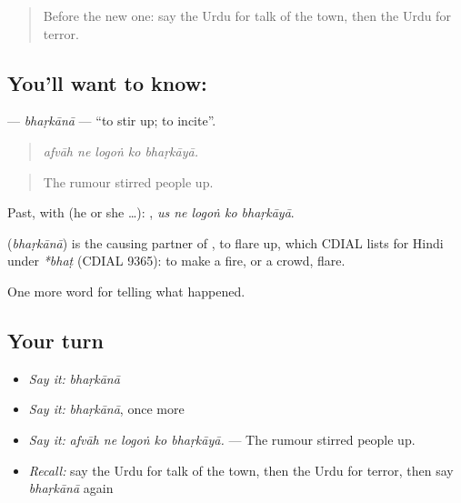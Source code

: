 \label{lesson:UR-C302-bharkana}



\begin{quote}
Before the new one: say the Urdu for talk of the town, then the Urdu for terror.
\end{quote}

\subsection*{You'll want to know: }
\textbf{} — \emph{bhaṛkānā} — \textquotedblleft{}to stir up; to incite\textquotedblright{}.

\begin{quote}
    
\end{quote}

\begin{quote}
\emph{afvāh ne logoṅ ko bhaṛkāyā.}
\end{quote}

\begin{quote}
The rumour stirred people up.
\end{quote}

Past, with  (he or she …):     , \emph{us ne logoṅ ko bhaṛkāyā}.

\begin{cousinweb}
\textbf{} (\emph{bhaṛkānā}) is the causing partner of \textbf{}, to flare up, which CDIAL lists for Hindi under \emph{*bhaṭ} (CDIAL 9365): to make a fire, or a crowd, flare.
\end{cousinweb}

\begin{grammarlens}[title={What you've built}]
One more word for telling what happened.
\end{grammarlens}

\subsection*{Your turn}
\begin{itemize}
\raggedright
  \item \emph{Say it:} \emph{bhaṛkānā}
  \item \emph{Say it:} \emph{bhaṛkānā}, once more
  \item \emph{Say it:} \emph{afvāh ne logoṅ ko bhaṛkāyā.} — The rumour stirred people up.
  \item \emph{Recall:} say the Urdu for talk of the town, then the Urdu for terror, then say \emph{bhaṛkānā} again
\end{itemize}

